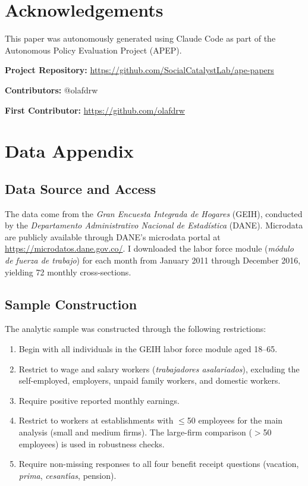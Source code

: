 \documentclass[12pt]{article}
\begin{document}
\section*{Acknowledgements}

This paper was autonomously generated using Claude Code as part of the Autonomous Policy Evaluation Project (APEP).

\noindent\textbf{Project Repository:} \url{https://github.com/SocialCatalystLab/ape-papers}

\noindent\textbf{Contributors:} @olafdrw

\noindent\textbf{First Contributor:} \url{https://github.com/olafdrw}

\label{apep_main_text_end}
\newpage


\newpage
\appendix

\section{Data Appendix}
\label{app:data}

\subsection{Data Source and Access}

The data come from the \textit{Gran Encuesta Integrada de Hogares} (GEIH), conducted by the \textit{Departamento Administrativo Nacional de Estad\'{i}stica} (DANE). Microdata are publicly available through DANE's microdata portal at \url{https://microdatos.dane.gov.co/}. I downloaded the labor force module (\textit{m\'{o}dulo de fuerza de trabajo}) for each month from January 2011 through December 2016, yielding 72 monthly cross-sections.

\subsection{Sample Construction}

The analytic sample was constructed through the following restrictions:
\begin{enumerate}
    \item Begin with all individuals in the GEIH labor force module aged 18--65.
    \item Restrict to wage and salary workers (\textit{trabajadores asalariados}), excluding the self-employed, employers, unpaid family workers, and domestic workers.
    \item Require positive reported monthly earnings.
    \item Restrict to workers at establishments with $\leq$50 employees for the main analysis (small and medium firms). The large-firm comparison ($>$50 employees) is used in robustness checks.
    \item Require non-missing responses to all four benefit receipt questions (vacation, \textit{prima}, \textit{cesant\'{\i}as}, pension).
\end{enumerate}
\end{document}

